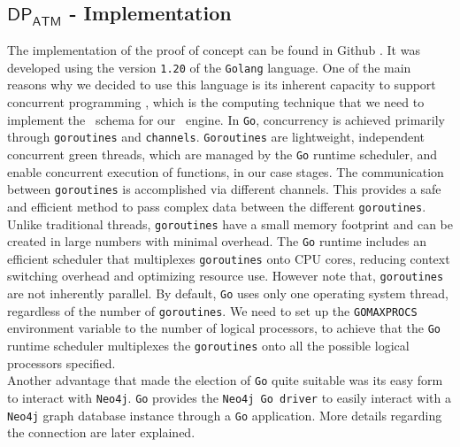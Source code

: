 \subsection*{$\mathsf{DP_{ATM}}$ - Implementation}\label{ContinuousQueryEngine-Implementation}

The implementation of the proof of concept can be found in Github \cite{ATM-DP-github}. It was developed using the version \texttt{1.20} of the \texttt{Golang} language. 
One of the main reasons why we decided to use this language is its inherent capacity to support concurrent programming \cite{Go-cbtnuggets_concurrency, Go-medium_concurrency, Go-reliasoftware_concurrency}, which is the computing technique that we need to implement the \DP\ schema for our \DPATM\ engine. In \texttt{Go}, concurrency is achieved primarily through \texttt{goroutines} and \texttt{channels}. \texttt{Goroutines} are lightweight, independent concurrent green threads, which are managed by the \texttt{Go} runtime scheduler, and enable concurrent execution of functions, in our case stages. The communication between \texttt{goroutines} is accomplished via different channels. This provides a safe and efficient method to pass complex data between the different \texttt{goroutines}. 
Unlike traditional threads, \texttt{goroutines} have a small memory footprint and can be created in large numbers with minimal overhead. The \texttt{Go} runtime includes an efficient scheduler that multiplexes \texttt{goroutines} onto CPU cores, reducing context switching overhead and optimizing resource use. However note that, \texttt{goroutines} are not inherently parallel. By default, \texttt{Go} uses only one operating system thread, regardless of the number of \texttt{goroutines}. We need to set up the \texttt{GOMAXPROCS} \cite{gomaxprocs} environment variable to the number of logical processors, to achieve that the \texttt{Go} runtime scheduler multiplexes the \texttt{goroutines} onto all the possible logical processors specified.\\

Another advantage that made the election of \texttt{Go} quite suitable was its easy form to interact with \texttt{Neo4j}. \texttt{Go} provides the \texttt{Neo4j Go driver} \cite{neo4j-go-neo4j_go_manual} to easily interact with a \texttt{Neo4j} graph database instance through a \texttt{Go} application. More details regarding the connection are later explained. 

